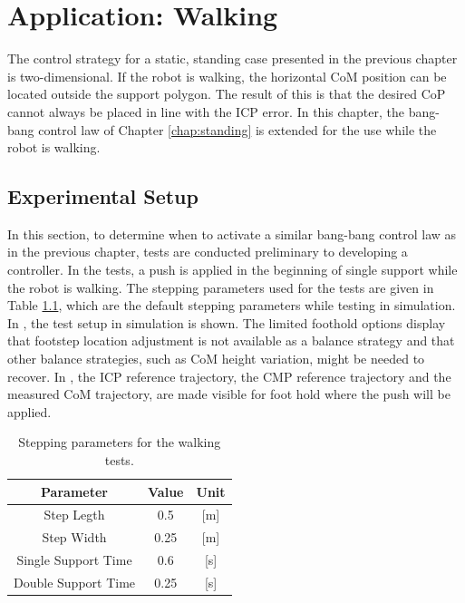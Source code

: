 %
\chapter{Application: Walking}\label{chap:walking}
The control strategy for a static, standing case presented in the previous chapter is two-dimensional. If the robot is walking, the horizontal \ac{CoM} position can be located outside the support polygon. The result of this is that the desired \ac{CoP} cannot always be placed in line with the \ac{ICP} error.  In this chapter, the bang-bang control law of Chapter \ref{chap:standing} is extended for the use while the robot is walking.
\section{Experimental Setup}
In this section, to determine when to activate a similar bang-bang control law as in the previous chapter,  tests are conducted preliminary to developing a controller. In the tests, a push is applied in the beginning of single support while the robot is walking. The stepping parameters used for the tests are given in Table \ref{tab:stepping}, which are the default stepping parameters while testing in simulation. In , the test setup in simulation is shown. The limited foothold options display that footstep location adjustment is not available as a balance strategy and that other balance strategies, such as \ac{CoM} height variation, might be needed to recover. In , the \ac{ICP} reference trajectory, the \ac{CMP} reference trajectory and the measured \ac{CoM} trajectory, are made visible for foot hold where the push will be applied. 
\begin{table}
\caption{Stepping parameters for the walking tests.} %
\centering %
\begin{tabular}{c c c } %
\hline\hline %
Parameter & Value & Unit \\
\hline %
Step Legth & 0.5 &  [m]\\
Step Width & 0.25 & [m]\\
Single Support Time & 0.6 & [s]\\
Double Support Time & 0.25 & [s]\\
\hline %
\end{tabular}
\label{tab:stepping} %
\end{table}

